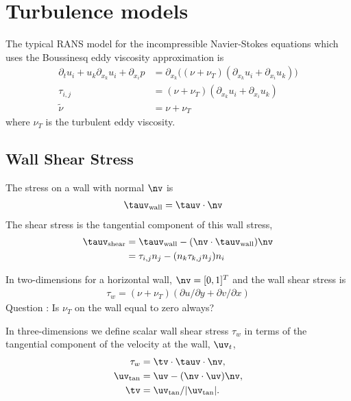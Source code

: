 \newcommand{\nuT}{\nu_T}
\newcommand{\nut}{{\widetilde \nu}}
\newcommand{\Dop}{{\cal D}}
\newcommand{\Dopu}{{\cal D}_u}
\newcommand{\Dopv}{{\cal D}_v}
\newcommand{\Dopw}{{\cal D}_w}

\section{Turbulence models}

The typical RANS model for the incompressible Navier-Stokes equations which uses the
Boussinesq eddy viscosity approximation is
\begin{align*}
  \partial_t u_i + u_k \partial_{x_k} u_i + \partial_{x_i} p &= 
             \partial_{x_k}\Big( (\nu+\nuT) (\partial_{x_k} u_i + \partial_{x_i} u_k) \Big) \\
   \tau_{i,j} &= (\nu+\nuT) (\partial_{x_k} u_i + \partial_{x_i} u_k) \\
    \nut &= \nu + \nuT
\end{align*}
where $\nuT$ is the turbulent eddy viscosity.

\subsection{Wall Shear Stress} \label{sec:wallShearStress}
The stress on a wall with normal $\nv$ is 
\begin{align*}
   \tauv_{\rm wall} &= \tauv \cdot \nv 
\end{align*}
The shear stress is the tangential component of this wall stress,
\begin{align*}
   \tauv_{\rm shear} &=  \tauv_{\rm wall} - (\nv\cdot\tauv_{\rm wall})\nv \\
                     &= \tau_{i,j}n_j - (n_k\tau_{k,j}n_j )n_i 
\end{align*}

In two-dimensions for a horizontal wall, $\nv=[0,1]^T$ and the wall shear stress is 
\begin{align*}
   \tau_w = (\nu+\nuT) (\partial u / \partial y + \partial v / \partial x )
\end{align*}
Question : Is $\nuT$ on the wall equal to zero always?

In three-dimensions we define scalar wall shear stress $\tau_w$ in terms of the
tangential component of the velocity at the wall, $\uv_t$, 
\begin{align*}
   \tau_w &= \tv \cdot \tauv \cdot \nv,  \\
   \uv_{\rm tan} &= \uv - (\nv\cdot\uv)\nv , \\
   \tv &= \uv_{\rm tan} / \vert \uv_{\rm tan} \vert . 
\end{align*}


